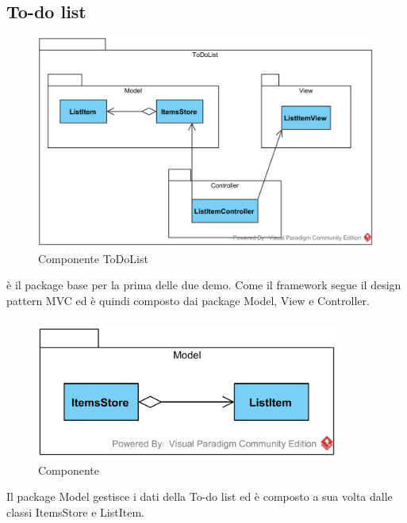 \subsection{To-do list}  \label{\class}
\begin{figure}[H]
	\centering
	\includegraphics[width=14cm]{./diagrammi/todo/todo.png}
	\caption{Componente ToDoList}
\end{figure}
 è il package base per la prima delle due demo. Come il framework segue il design pattern MVC ed è quindi composto dai package Model, View e Controller.

\subsubsection[::Model]{\class} \label{\class}
\begin{figure}[H]
	\centering
	\includegraphics[width=10cm]{./diagrammi/todo/todomodel.png}
	\caption{Componente \class}
\end{figure}
Il package Model gestisce i dati della To-do list ed è composto a sua volta dalle classi ItemsStore e ListItem.


